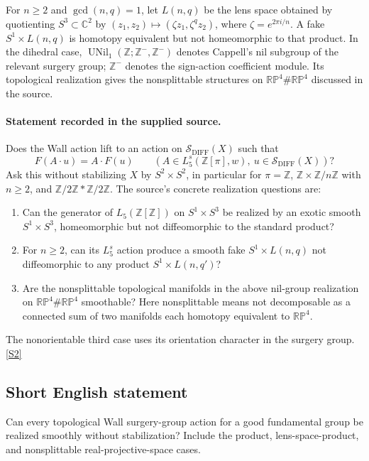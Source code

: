\documentclass[11pt]{article}
\newcommand{\sref}[2]{\hyperlink{source:#1:#2}{[S#2]}}
\begin{document}
For $n\ge2$ and $\gcd(n,q)=1$, let $L(n,q)$ be the lens space obtained by quotienting $S^3\subset\mathbb C^2$ by $(z_1,z_2)\mapsto(\zeta z_1,\zeta^qz_2)$, where $\zeta=e^{2\pi i/n}$. A fake $S^1\times L(n,q)$ is homotopy equivalent but not homeomorphic to that product. In the dihedral case, $\operatorname{UNil}_1(\mathbb Z;\mathbb Z^-,\mathbb Z^-)$ denotes Cappell's nil subgroup of the relevant surgery group; $\mathbb Z^-$ denotes the sign-action coefficient module. Its topological realization gives the nonsplittable structures on $\mathbb{RP}^4\#\mathbb{RP}^4$ discussed in the source.
\paragraph{Statement recorded in the supplied source.}
Does the Wall action lift to an action on $\mathcal S_{\mathrm{DIFF}}(X)$ such that
\[
F(A\cdot u)=A\cdot F(u)\qquad
(A\in L_5^s(\mathbb Z[\pi],w),\ u\in\mathcal S_{\mathrm{DIFF}}(X))?
\]
Ask this without stabilizing $X$ by $S^2\times S^2$, in particular for $\pi=\mathbb Z$, $\mathbb Z\times\mathbb Z/n\mathbb Z$ with $n\ge2$, and $\mathbb Z/2\mathbb Z*\mathbb Z/2\mathbb Z$. The source's concrete realization questions are:
\begin{enumerate}
\item[(i)] Can the generator of $L_5(\mathbb Z[\mathbb Z])$ on $S^1\times S^3$ be realized by an exotic smooth $S^1\times S^3$, homeomorphic but not diffeomorphic to the standard product?
\item[(ii)] For $n\ge2$, can its $L_5^s$ action produce a smooth fake $S^1\times L(n,q)$ not diffeomorphic to any product $S^1\times L(n,q')$?
\item[(iii)] Are the nonsplittable topological manifolds in the above nil-group realization on $\mathbb{RP}^4\#\mathbb{RP}^4$ smoothable? Here nonsplittable means not decomposable as a connected sum of two manifolds each homotopy equivalent to $\mathbb{RP}^4$.
\end{enumerate}
The nonorientable third case uses its orientation character in the surgery group. \sref{2898}{2}
\subsection{Short English statement}
Can every topological Wall surgery-group action for a good fundamental group be realized smoothly without stabilization? Include the product, lens-space-product, and nonsplittable real-projective-space cases.
\end{document}
